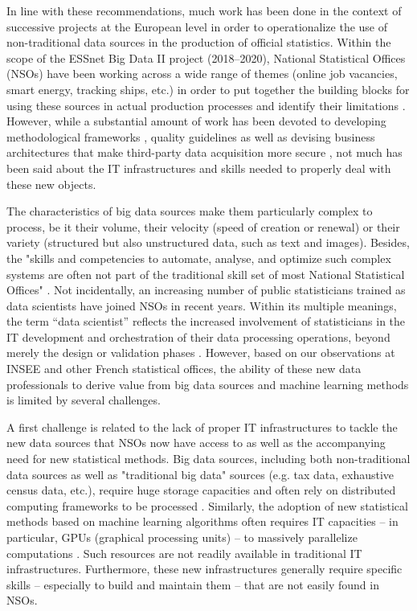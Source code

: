 \documentclass[graybox]{svmult}
\begin{document}
In line with these recommendations, much work has been done in the context of successive projects at the European level in order to operationalize the use of non-traditional data sources in the production of official statistics. Within the scope of the ESSnet Big Data II project (2018--2020), National Statistical Offices (NSOs) have been working across a wide range of themes (online job vacancies, smart energy, tracking ships, etc.) in order to put together the building blocks for using these sources in actual production processes and identify their limitations \citep{essnetbigdata2}. However, while a substantial amount of work has been devoted to developing methodological frameworks \citep{descy2019towards, salgado2020mobile}, quality guidelines \citep{kowarik2022quality} as well as devising business architectures that make third-party data acquisition more secure \citep{ricciato2018processing}, not much has been said about the IT infrastructures and skills needed to properly deal with these new objects.

The characteristics of big data sources make them particularly complex to process, be it their volume, their velocity (speed of creation or renewal) or their variety (structured but also unstructured data, such as text and images). Besides, the "skills and competencies to automate, analyse, and optimize such complex systems are often not part of the traditional skill set of most National Statistical Offices" \citep{ashofteh2021data}. Not incidentally, an increasing number of public statisticians trained as data scientists have joined NSOs in recent years. Within its multiple meanings, the term “data scientist” reflects the increased involvement of statisticians in the IT development and orchestration of their data processing operations, beyond merely the design or validation phases \citep{davenport2012data}. However, based on our observations at INSEE and other French statistical offices, the ability of these new data professionals to derive value from big data sources and machine learning methods is limited by several challenges.

A first challenge is related to the lack of proper IT infrastructures to tackle the new data sources that NSOs now have access to as well as the accompanying need for new statistical methods. Big data sources, including both non-traditional data sources as well as "traditional big data" sources (e.g. tax data, exhaustive census data, etc.), require huge storage capacities and often rely on distributed computing frameworks to be processed \citep{liu2013computing}. Similarly, the adoption of new statistical methods based on machine learning algorithms often requires IT capacities -- in particular, GPUs (graphical processing units) -- to massively parallelize computations \citep{saiyeda2017cloud}. Such resources are not readily available in traditional IT infrastructures. Furthermore, these new infrastructures generally require specific skills -- especially to build and maintain them -- that are not easily found in NSOs.
\end{document}
